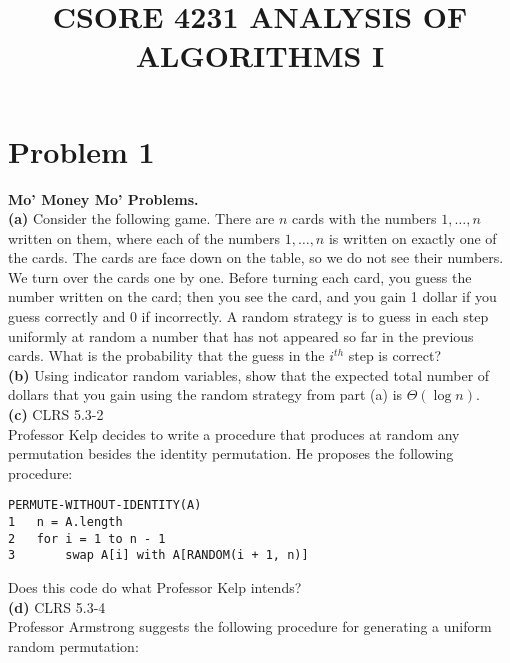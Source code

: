 \documentclass{article}
\title{CSORE 4231 ANALYSIS OF ALGORITHMS I \exerciseset}
\author{\studentname  \qquad \suid}
\begin{document}
\maketitle

\section*{Problem 1}
\textbf{Mo’ Money Mo’ Problems.}\\
\textbf{(a)}  Consider the following game. There are \( n \) cards with the numbers \( 1, \ldots, n \) written on them, where each of the numbers \( 1, \ldots, n \) is written on exactly one of the cards. The cards are face down on the table, so we do not see their numbers. We turn over the cards one by one. Before turning each card, you guess the number written on the card; then you see the card, and you gain 1 dollar if you guess correctly and 0 if incorrectly. A random strategy is to guess in each step uniformly at random a number that has not appeared so far in the previous cards. What is the probability that the guess in the \( i^{th} \) step is correct?\\
\textbf{(b)} Using indicator random variables, show that the expected total number of dollars that you gain using the random strategy from part (a) is \( \Theta(\log n) \).\\
\textbf{(c)} CLRS 5.3-2\\
Professor Kelp decides to write a procedure that produces at random any permutation besides the identity permutation. He proposes the following procedure:

\begin{verbatim}
PERMUTE-WITHOUT-IDENTITY(A)
1   n = A.length
2   for i = 1 to n - 1
3       swap A[i] with A[RANDOM(i + 1, n)]
\end{verbatim}
Does this code do what Professor Kelp intends?\\
\textbf{(d)} CLRS 5.3-4\\
Professor Armstrong suggests the following procedure for generating a uniform random permutation:
\end{document}
